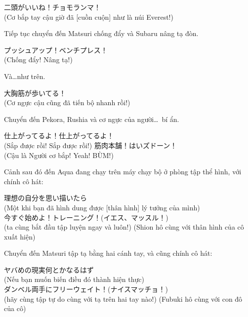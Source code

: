 \documentclass[../main.tex]{subfiles}
\begin{document}

\begin{dialogue}
   二頭がいいね！チョモランマ！\\(Cơ bắp tay cậu giờ đã [cuồn cuộn] như là núi Everest!)
\end{dialogue}

Tiếp tục chuyển đến Matsuri chống đẩy và Subaru nâng tạ đòn.

\begin{dialogue}
   プッシュアップ！ベンチプレス！\\(Chống đẩy! Nâng tạ!)
\end{dialogue}

Và\dots  như trên.

\begin{dialogue}
   大胸筋が歩いてる！\\(Cơ ngực cậu cũng đã tiến bộ nhanh rồi!)
\end{dialogue}

Chuyển đến Pekora, Rushia và cơ ngực của người\dots\ bí ẩn.

\begin{dialogue}
   仕上がってるよ！仕上がってるよ！\\(Sắp được rồi! Sắp được rồi!)
  筋肉本舗！はいズドーン！\\(Cậu là Người cơ bắp! Yeah! BÙM!)
\end{dialogue}

Cảnh sau đó đến Aqua đang chạy trên máy chạy bộ ở phòng tập thể hình, với chính cô hát:

\begin{dialogue}
   理想の自分を思い描いたら\\(Một khi bạn đã hình dung được [thân hình] lý tưởng của mình)\\
  今すぐ始めよ！トレーニング！(イエス、マッスル！)\\(ta cùng bắt đầu tập luyện ngay và luôn!) (Shion hô cùng với thân hình của cô xuất hiện)
\end{dialogue}

Chuyển đến Matsuri tập tạ bằng hai cánh tay, và cũng chính cô hát:

\begin{dialogue}
   ヤバめの現実何とかなるはず\\(Nếu bạn muốn biến điều đó thành hiện thực)\\
  ダンベル両手にフリーウェイト！(ナイスマッチョ！)\\(hãy cùng tập tự do cùng với tạ trên hai tay nào!) (Fubuki hô cùng với con đô của cô)
\end{dialogue}
\end{document}
